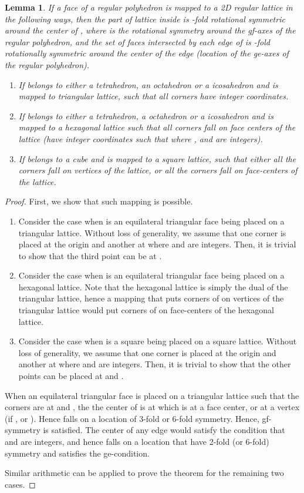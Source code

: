 \documentclass[11pt]{article}
\newtheorem{lemma}[thm]{Lemma}
\newcommand{\1}{\mathds{1}}
\begin{document}
\begin{lemma}
 \label{lemma:assemblytheory:sufficient1}
 If a face  of a regular polyhedron is mapped to a 2D regular lattice in the following ways, then the part of lattice inside  is -fold rotational symmetric around the center of , where  is the rotational symmetry around the gf-axes of the regular polyhedron, and the set of faces intersected by each edge of  is -fold rotationally symmetric around the center of the edge (location of the ge-axes of the regular polyhedron).
 \begin{enumerate}
  \item If  belongs to either a tetrahedron, an octahedron or a icosahedron and is mapped to triangular lattice, such that all corners have integer coordinates.
  \item If  belongs to either a tetrahedron, a octahedron or a icosahedron and is mapped to a hexagonal lattice such that all corners fall on face centers of the lattice (have integer coordinates  such that  where ,  and  are integers).
  \item If  belongs to a cube and is mapped to a square lattice, such that either all the corners fall on vertices of the lattice, or all the corners fall on face-centers of the lattice.
 \end{enumerate}
\end{lemma}

\begin{proof}
 First, we show that such mapping is possible.
 \begin{enumerate}
  \item Consider the case when  is an equilateral triangular face being placed on a triangular lattice. Without loss of generality, we assume that one corner is placed at the origin and another at  where  and  are integers. Then, it is trivial to show that the third point can be at .
  \item Consider the case when  is an equilateral triangular face being placed on a hexagonal lattice. Note that the hexagonal lattice is simply the dual of the triangular lattice, hence a mapping that puts corners of  on vertices of the triangular lattice would put corners of  on face-centers of the hexagonal lattice.
 \item Consider the case when  is a square being placed on a square lattice. Without loss of generality, we assume that one corner is placed at the origin and another at  where  and  are integers. Then, it is trivial to show that the other points can be placed at  and .
 \end{enumerate}

 When an equilateral triangular face  is placed on a triangular lattice such that the corners are at  and , the the center  of  is at  which is at a face center, or at a vertex (if , or ). Hence  falls on a location of 3-fold or 6-fold symmetry. Hence, gf-symmetry is satisfied. The center  of any edge would satisfy the condition that  and  are integers, and hence falls on a location that have 2-fold (or 6-fold) symmetry and satisfies the ge-condition.

 Similar arithmetic can be applied to prove the theorem for the remaining two cases.
\end{proof}
\end{document}
